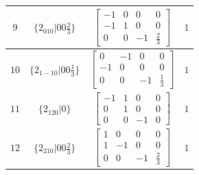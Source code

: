 \documentclass[fleqn,8pt]{jsarticle}
\begin{document}
\begin{longtable}{cccc}
$ 9 $ & $ \{2{}_{010}|0 0 \frac{2}{3}\} $ & $ \begin{bmatrix} -1 & 0 & 0 & 0 \\ -1 & 1 & 0 & 0 \\ 0 & 0 & -1 & \frac{2}{3} \end{bmatrix} $ & $ 1 $ \\ \hline
$ 10 $ & $ \{2{}_{1-10}|0 0 \frac{1}{3}\} $ & $ \begin{bmatrix} 0 & -1 & 0 & 0 \\ -1 & 0 & 0 & 0 \\ 0 & 0 & -1 & \frac{1}{3} \end{bmatrix} $ & $ 1 $ \\ \hline
$ 11 $ & $ \{2{}_{120}|0\} $ & $ \begin{bmatrix} -1 & 1 & 0 & 0 \\ 0 & 1 & 0 & 0 \\ 0 & 0 & -1 & 0 \end{bmatrix} $ & $ 1 $ \\ \hline
$ 12 $ & $ \{2{}_{210}|0 0 \frac{2}{3}\} $ & $ \begin{bmatrix} 1 & 0 & 0 & 0 \\ 1 & -1 & 0 & 0 \\ 0 & 0 & -1 & \frac{2}{3} \end{bmatrix} $ & $ 1 $ \\
\end{longtable}
\end{document}

